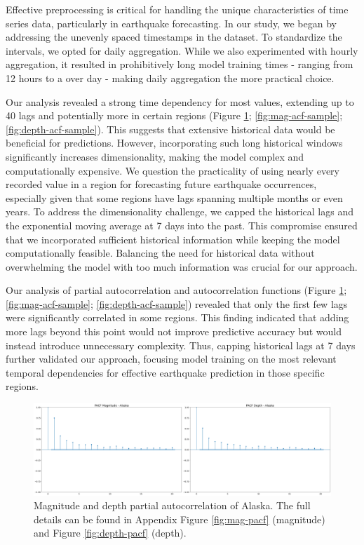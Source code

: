 Effective preprocessing is critical for handling the unique characteristics of
time series data, particularly in earthquake forecasting. In our study, we began
by addressing the unevenly spaced timestamps in the dataset. To standardize the
intervals, we opted for daily aggregation. While we also experimented with hourly
aggregation, it resulted in prohibitively long model training times - ranging
from 12 hours to a over day - making daily aggregation the more practical choice.

Our analysis revealed a strong time dependency for most values, extending up to
40 lags and potentially more in certain regions (Figure \ref{fig:pacf-sample};
\ref{fig:mag-acf-sample}; \ref{fig:depth-acf-sample}). This suggests that extensive
historical data would be beneficial for predictions. However, incorporating
such long historical windows significantly increases dimensionality, making
the model complex and computationally expensive. We question the practicality
of using nearly every recorded value in a region for forecasting future earthquake
occurrences, especially given that some regions have lags spanning multiple months or even years.
To address the dimensionality challenge, we capped the historical lags and the
exponential moving average at 7 days into the past. This compromise ensured that
we incorporated sufficient historical information while keeping the model
computationally feasible. Balancing the need for historical data without
overwhelming the model with too much information was crucial for our approach.

Our analysis of partial autocorrelation and autocorrelation functions
(Figure \ref{fig:pacf-sample};
\ref{fig:mag-acf-sample}; \ref{fig:depth-acf-sample}) revealed
that only the first few lags were significantly correlated in some regions.
This finding indicated that adding more lags beyond this point would not
improve predictive accuracy but would instead introduce unnecessary complexity.
Thus, capping historical lags at 7 days further validated our approach, focusing
model training on the most relevant temporal dependencies for effective earthquake
prediction in those specific regions.

\begin{figure}[hbtp]
  \centering
  \includegraphics[scale=0.2]{img/pacf-sample.png}
  \captionsetup{format=hang}
  \caption{\label{fig:pacf-sample}Magnitude and depth partial autocorrelation of Alaska.
    The full details can be found in Appendix Figure \ref{fig:mag-pacf} (magnitude)
    and Figure \ref{fig:depth-pacf} (depth).}
\end{figure}

